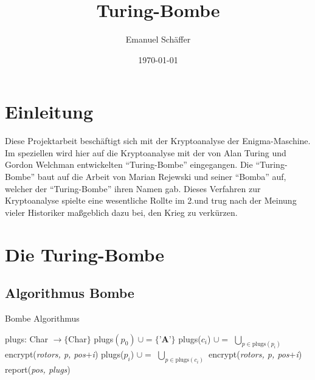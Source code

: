 \documentclass[ngerman, a4paper, footsepline, headsepline]{scrreport}
\begin{document}
	\subject{Kryptoanalyse der Enigma-Maschine durch eine Software-Nachbildung der Turing-Bombe}
	\title{Turing-Bombe}
	\author{Emanuel Schäffer}
	\date{\today}
	\publishers{RWU--University of Applied Sciences}
	\maketitle
	
	\tableofcontents

%	

	\chapter{Einleitung}
	Diese Projektarbeit beschäftigt sich mit der Kryptoanalyse der Enigma-Maschine. Im speziellen wird hier auf die Kryptoanalyse mit der von Alan Turing und Gordon Welchman entwickelten ``Turing-Bombe'' eingegangen. Die ``Turing-Bombe'' baut auf die Arbeit von Marian Rejewski und seiner ``Bomba'' auf, welcher der ``Turing-Bombe'' ihren Namen gab. Dieses Verfahren zur Kryptoanalyse spielte eine wesentliche Rollte im 2.\@Weltkrieg und trug nach der Meinung vieler Historiker maßgeblich dazu bei, den Krieg zu verkürzen.


		
	
	\chapter{Die Turing-Bombe}
	
	\section{Algorithmus Bombe}
	
	\begin{algorithm}
		\caption{Bombe Algorithmus}
		\begin{algorithmic}[1]
					\State plugs: Char $\rightarrow \{ $Char$\}$
					\State plugs$(p_0)\ \cup= \{\textbf{'A'}\}$
							\State plugs($c_i$) $\cup=$ $\bigcup_{p \in \text{plugs}(p_i)}$ encrypt(\textsl{rotors, p, pos}+\textsl{i})
							\State plugs($p_i$) $\cup=$ $\bigcup_{p \in \text{plugs}(c_i)}$ encrypt(\textsl{rotors, p, pos}+\textsl{i})
						\EndFor
					\EndWhile
						\State report(\textsl{pos, plugs})
					\EndIf
				\EndFor
			\EndProcedure
		\end{algorithmic}
	\end{algorithm}
	
\end{document}
